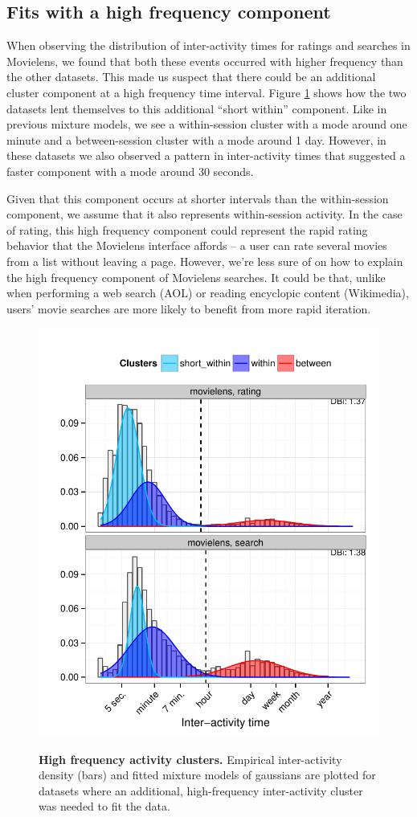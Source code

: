 \subsection{Fits with a high frequency component}
When observing the distribution of inter-activity times for ratings and searches in Movielens, we found that both these events occurred with higher frequency than the other datasets.  This made us suspect that there could be an additional cluster component at a high frequency time interval.  Figure \ref{fig:operation_mixed_clusters} shows how the two datasets lent themselves to this additional ``short within'' component.  Like in previous mixture models, we see a within-session cluster with a mode around one minute and a between-session cluster with a mode around 1 day.  However, in these datasets we also observed a pattern in inter-activity times that suggested a faster component with a mode around 30 seconds.

Given that this component occurs at shorter intervals than the within-session component, we assume that it also represents within-session activity.  In the case of rating, this high frequency component could represent the rapid rating behavior that the Movielens interface affords -- a user can rate several movies from a list without leaving a page.  However, we're less sure of on how to explain the high frequency component of Movielens searches.  It could be that, unlike when performing a web search (AOL) or reading encyclopic content (Wikimedia), users' movie searches are more likely to benefit from more rapid iteration.
\begin{figure}
\centering
\includegraphics[width=.45\textwidth]{figures/operation_mixed_clusters.pdf}
\label{fig:operation_mixed_clusters}
\caption{
    \textbf{High frequency activity clusters.} Empirical inter-activity density (bars) and fitted mixture models of gaussians are plotted for datasets where an additional, high-frequency inter-activity cluster was needed to fit the data.
}
\end{figure}

